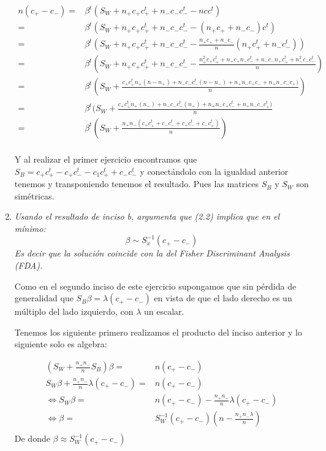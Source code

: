 \documentclass[paper=letter, fontsize=11pt]{scrartcl}
\numberwithin{equation}{section} %
\numberwithin{figure}{section} %
\numberwithin{table}{section} %
\begin{document}
\begin{enumerate}
\begin{equation*}
\begin{split}
n(c_+-c_-) = & \beta ^t( S_W + n_+ c_+ c_+^t + n_-c_-c_-^t -n c c^t ) \\
= & \beta^t( S_W +n_+ c_+c_+^t +n_-c_-c_-^t -(n_+c_+ + n_-c_-)c^t ) \\
= & \beta^t( S_W +n_+ c_+c_+^t +n_-c_-c_-^t -\frac{n_+c_+ + n_-c_-}{n}(n_+c_+^t+n_-c_-^t ) )\\
= & \beta^t( S_W +n_+ c_+c_+^t +n_-c_-c_-^t -\frac{n_+^2c_+c_+^t +n_+c_+n_-c_-^t + n_-c_-n_+c_+^t + n_-^2c_-c_-^t }{n}) \\
= & \beta^t( S_W + \frac{c_+c_+^tn_+(n-n_+) +n_-c_-c_-^t(n-n_-)+ n_+n_-c_+c_-+n_+n_-c_-c_+)}{n} )  \\
= & \beta^t( S_W + \frac{c_+c_+^tn_+(n_-) +n_-c_-c_-^t(n_+)+ n_+n_-c_+ c_-^t + n_+n_-c_-c_+^t)}{n} \\
= & \beta^t( S_W + \frac{n_+n_-(c_+c_+^t+c_-c_-^t+ c_+c_-^t +c_-c_+^t)}{n}) \\
\end{split}
\end{equation*}

Y al realizar el primer ejercicio encontramos que $S_B = c_+c_+^t -c_+c_-^t -c_1c_+^t + c_- c_-^t $ y conectándolo con la igualdad anterior tenemos y transponiendo tenemos el resultado. Pues las matrices $S_B$ y $S_W$ son simétricas. 


\item \textit{Usando el resultado de inciso b, argumenta que (2.2) implica que en el mínimo:}
\[\beta \sim S_x^{-1}(c_+-c_-) \]
\textit{Es decir que la solución coincide con la del Fisher Discriminant Analysis (FDA).}

Como en el segundo inciso de este ejercicio supongamos que sin pérdida de generalidad que $S_B \beta= \lambda (c_+-c_-)$ en vista de que el lado derecho es un múltiplo del lado izquierdo, con $\lambda$ un escalar.

Tenemos los siguiente primero realizamos el producto del inciso anterior y lo siguiente solo es algebra:

\begin{equation*}
\begin{split}
(S_W+\frac{n_+n_-}{n}S_B)\beta = & n(c_+-c_-)\\
S_W\beta + \frac{n_+n_-}{n}\lambda(c_+-c_-) =& n(c_+-c_-)\\
\Longleftrightarrow  S_W\beta  = &  n(c_+-c_-)- \frac{n_+n_-}{n} \lambda(c_+-c_-)\\
\Longleftrightarrow  \beta  = &  S_W^{-1}(c_+-c_-)(n- \frac{n_+n_-\lambda}{n} )\\
\end{split}
\end{equation*}
De donde $\beta \approx  S_W^{-1}(c_+-c_-)$



\end{enumerate}
\end{document}
